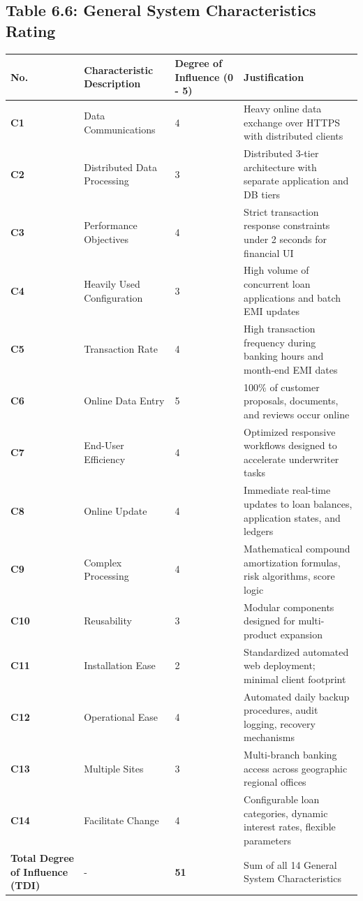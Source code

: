 \documentclass[12pt,a4paper,oneside]{report}
\begin{document}
\subsection{Table 6.6: General System Characteristics Rating}

\begin{table}[htbp]
\centering
\small
\begin{tabularx}{\textwidth}{l l X X}
\toprule
\textbf{No.} & \textbf{Characteristic Description} & \textbf{Degree of Influence (0 - 5)} & \textbf{Justification} \\
\midrule
\textbf{C1} & Data Communications & 4 & Heavy online data exchange over HTTPS with distributed clients \\
\textbf{C2} & Distributed Data Processing & 3 & Distributed 3-tier architecture with separate application and DB tiers \\
\textbf{C3} & Performance Objectives & 4 & Strict transaction response constraints under 2 seconds for financial UI \\
\textbf{C4} & Heavily Used Configuration & 3 & High volume of concurrent loan applications and batch EMI updates \\
\textbf{C5} & Transaction Rate & 4 & High transaction frequency during banking hours and month-end EMI dates \\
\textbf{C6} & Online Data Entry & 5 & 100\% of customer proposals, documents, and reviews occur online \\
\textbf{C7} & End-User Efficiency & 4 & Optimized responsive workflows designed to accelerate underwriter tasks \\
\textbf{C8} & Online Update & 4 & Immediate real-time updates to loan balances, application states, and ledgers \\
\textbf{C9} & Complex Processing & 4 & Mathematical compound amortization formulas, risk algorithms, score logic \\
\textbf{C10} & Reusability & 3 & Modular components designed for multi-product expansion \\
\textbf{C11} & Installation Ease & 2 & Standardized automated web deployment; minimal client footprint \\
\textbf{C12} & Operational Ease & 4 & Automated daily backup procedures, audit logging, recovery mechanisms \\
\textbf{C13} & Multiple Sites & 3 & Multi-branch banking access across geographic regional offices \\
\textbf{C14} & Facilitate Change & 4 & Configurable loan categories, dynamic interest rates, flexible parameters \\
\textbf{Total Degree of Influence (TDI)} & - & \textbf{51} & Sum of all 14 General System Characteristics \\
\bottomrule
\end{tabularx}
\end{table}
\end{document}
